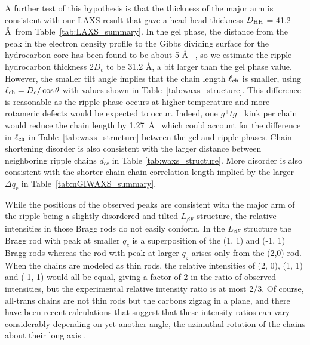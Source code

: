 A further test of this hypothesis is that the thickness of the major arm is 
consistent with our LAXS result that gave a head-head thickness 
$D_\textrm{HH}$ = 41.2 \AA\ from Table~\ref{tab:LAXS_summary}. In the gel phase, the 
distance from the peak in the electron density profile to the Gibbs dividing 
surface for the hydrocarbon core has been found to be about 5 \AA
~\cite{Tristram-Nagle02}, so we estimate the ripple hydrocarbon thickness 
2$D_c$ to be 31.2 \AA, a bit larger than the gel phase value. However, the 
smaller tilt angle implies that the chain length $\ell_\text{ch}$ is smaller, using 
$\ell_\text{ch}=D_c/\cos{\theta}$ with values shown in Table~\ref{tab:waxs_structure}.  
This difference is reasonable as the ripple phase occurs at higher temperature 
and more rotameric defects would be expected to occur.  Indeed, one 
$g^+tg^-$ kink per chain would reduce the chain length by 1.27~\AA\ 
\cite{ref:Trauble71,ref:Nagle80}
which could
account for the difference in $\ell_\text{ch}$ in Table~\ref{tab:waxs_structure}
between the gel and ripple phases.  
Chain shortening disorder is also consistent with the larger distance 
between neighboring ripple chains $d_{cc}$ in Table \ref{tab:waxs_structure}.  
More disorder is also consistent with the shorter chain-chain correlation 
length implied by the larger ${\Delta}q_r$ in Table~\ref{tab:nGIWAXS_summary}.

While the positions of the observed peaks are consistent
with the major arm of the ripple being a slightly disordered and tilted 
$L_{\beta F}$ structure, 
the relative intensities in those Bragg rods do not easily conform. 
In the $L_{\beta F}$ structure the Bragg rod with peak at smaller $q_z$ is a 
superposition of the (1, 1) and (-1, 1) Bragg rods whereas the rod with peak 
at larger $q_z$ arises only from the (2,0) rod.  When the chains are modeled as 
thin rods, the relative intensities 
of (2, 0), (1, 1) and (-1, 1) would all be equal, giving a factor of 2 in the 
ratio of observed intensities, but the experimental relative intensity ratio 
is at most 2/3. Of course, all-trans chains are not thin rods but the carbons 
zigzag in a plane, and there have been recent calculations that suggest that 
these intensity ratios can vary considerably depending on yet another angle, 
the azimuthal rotation of the chains about their long axis \cite{ref:Akabori14,ref:Watkins14}.

